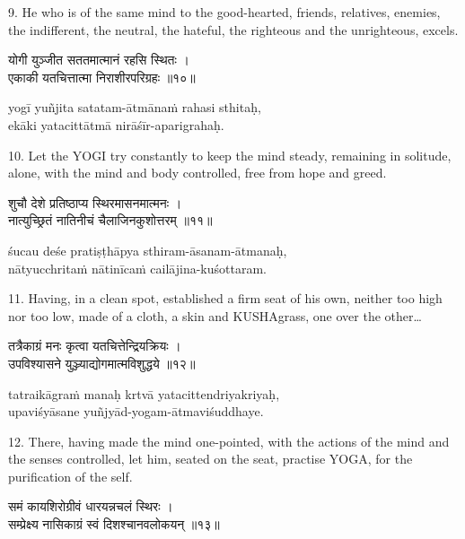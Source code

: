 9. He who is of the same mind to the good-hearted, friends, relatives, enemies,
the indifferent, the neutral, the hateful, the righteous and the unrighteous,
excels.

\begin{gitaverse}
योगी युञ्जीत सततमात्मानं रहसि स्थितः । \\
एकाकी यतचित्तात्मा निराशीरपरिग्रहः ॥१०॥
\end{gitaverse}

\begin{transliteration}
yogī yuñjita satatam-ātmānaṁ rahasi sthitaḥ, \\
ekāki yatacittātmā nirāśīr-aparigrahaḥ.
\end{transliteration}

10. Let the YOGI try constantly to keep the mind steady, remaining in solitude,
alone, with the mind and body controlled, free from hope and greed.

\begin{gitaverse}
शुचौ देशे प्रतिष्ठाप्य स्थिरमासनमात्मनः । \\
नात्युच्छ्रितं नातिनीचं चैलाजिनकुशोत्तरम् ॥११॥
\end{gitaverse}

\begin{transliteration}
śucau deśe pratiṣṭhāpya sthiram-āsanam-ātmanaḥ, \\
nātyucchritaṁ nātinīcaṁ cailājina-kuśottaram.
\end{transliteration}

11. Having, in a clean spot, established a firm seat of his own, neither too
high nor too low, made of a cloth, a skin and KUSHAgrass, one over the
other\ldots

\begin{gitaverse}
तत्रैकाग्रं मनः कृत्वा यतचित्तेन्द्रियक्रियः । \\
उपविश्यासने युञ्ज्याद्योगमात्मविशुद्धये ॥१२॥
\end{gitaverse}

\begin{transliteration}
tatraikāgraṁ manaḥ krtvā yatacittendriyakriyaḥ, \\
upaviśyāsane yuñjyād-yogam-ātmaviśuddhaye.
\end{transliteration}

12. There, having made the mind one-pointed, with the actions of the mind and
the senses controlled, let him, seated on the seat, practise YOGA, for the
purification of the self.

\begin{gitaverse}
समं कायशिरोग्रीवं धारयन्नचलं स्थिरः । \\
सम्प्रेक्ष्य नासिकाग्रं स्वं दिशश्चानवलोकयन् ॥१३॥
\end{gitaverse}


